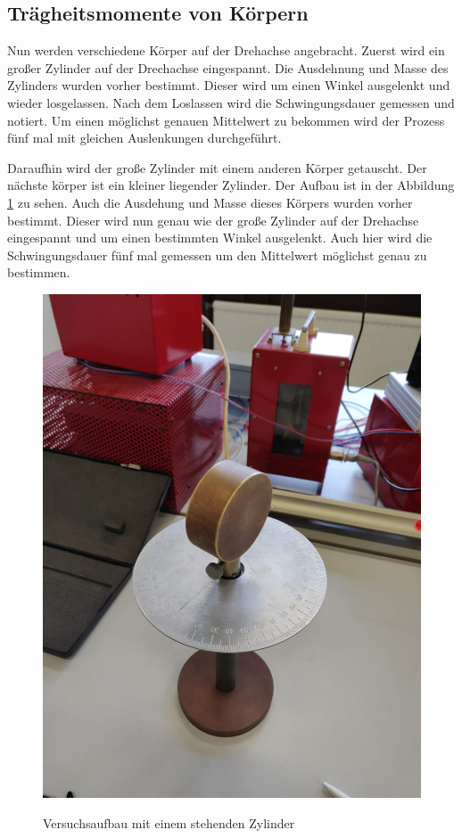 \subsection{Trägheitsmomente von Körpern}
\FloatBarrier
Nun werden verschiedene Körper auf der Drehachse angebracht.
Zuerst wird ein großer Zylinder auf der Drechachse eingespannt.
Die Ausdehnung und Masse des Zylinders wurden vorher bestimmt.
Dieser wird um einen Winkel ausgelenkt und wieder losgelassen.
Nach dem Loslassen wird die Schwingungsdauer gemessen und notiert.
Um einen möglichst genauen Mittelwert zu bekommen wird der Prozess fünf mal mit gleichen Auslenkungen durchgeführt.

Daraufhin wird der große Zylinder mit einem anderen Körper getauscht.
Der nächste körper ist ein kleiner liegender Zylinder.
Der Aufbau ist in der Abbildung \ref{fig:ZylinderStehend} zu sehen.
Auch die Ausdehung und Masse dieses Körpers wurden vorher bestimmt.
Dieser wird nun genau wie der große Zylinder auf der Drehachse eingespannt und um einen bestimmten Winkel ausgelenkt.
Auch hier wird die Schwingungsdauer fünf mal gemessen um den Mittelwert möglichst genau zu bestimmen.
\FloatBarrier
\begin{figure}
\centering
\caption{Versuchsaufbau mit einem stehenden Zylinder}
\includegraphics[scale=0.1]{content/data/ZylinderStehend.png}
\label{fig:ZylinderStehend}
\end{figure}

